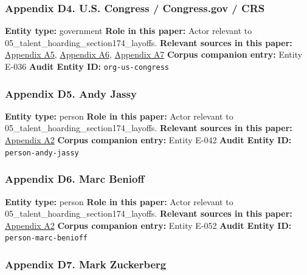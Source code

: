 \documentclass[
  american,
  11pt,
  letterpaper,
]{article}
\begin{document}
\subsubsection{Appendix D4. U.S. Congress / Congress.gov /
CRS}\label{ch-05-appendix-d4-u-s-congress-congress-gov-crs}

\textbf{Entity type:} government \textbf{Role in this paper:} Actor
relevant to 05\_talent\_hoarding\_section174\_layoffs. \textbf{Relevant
sources in this paper:}
\hyperref[ch-05-appendix-a5-h-r-7024-tax-relief-for-american-families-and-workers-act-of-2024]{Appendix
A5},
\hyperref[ch-05-appendix-a6-h-r-7024-tax-relief-for-american-families-and-workers-act-of-2024-crs-summary]{Appendix
A6},
\hyperref[ch-05-appendix-a7-h-r-7024-text-deduction-for-domestic-research-and-experimental-expenditures]{Appendix
A7} \textbf{Corpus companion entry:} Entity E-036 \textbf{Audit Entity
ID:} \texttt{org-us-congress}

\subsubsection{Appendix D5. Andy
Jassy}\label{ch-05-appendix-d5-andy-jassy}

\textbf{Entity type:} person \textbf{Role in this paper:} Actor relevant
to 05\_talent\_hoarding\_section174\_layoffs. \textbf{Relevant sources
in this paper:}
\hyperref[ch-05-appendix-a2-amazon-salesforce-jettison-jobs-in-latest-tech-worker-purge]{Appendix
A2} \textbf{Corpus companion entry:} Entity E-042 \textbf{Audit Entity
ID:} \texttt{person-andy-jassy}

\subsubsection{Appendix D6. Marc
Benioff}\label{ch-05-appendix-d6-marc-benioff}

\textbf{Entity type:} person \textbf{Role in this paper:} Actor relevant
to 05\_talent\_hoarding\_section174\_layoffs. \textbf{Relevant sources
in this paper:}
\hyperref[ch-05-appendix-a2-amazon-salesforce-jettison-jobs-in-latest-tech-worker-purge]{Appendix
A2} \textbf{Corpus companion entry:} Entity E-052 \textbf{Audit Entity
ID:} \texttt{person-marc-benioff}

\subsubsection{Appendix D7. Mark
Zuckerberg}\label{ch-05-appendix-d7-mark-zuckerberg}
\end{document}
